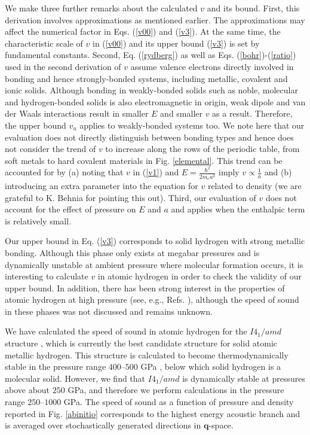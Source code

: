 \documentclass[aps,prl,groupedaddress,fleqn,twocolumn,10pt]{revtex4-1}
\begin{document}
We make three further remarks about the calculated $v$ and its bound. First, this derivation involves approximations as mentioned earlier. The approximations may affect the numerical factor in Eqs. (\ref{v00}) and (\ref{v3}). At the same time, the characteristic scale of $v$ in (\ref{v00}) and its upper bound (\ref{v3}) is set by fundamental constants. Second, Eq. (\ref{rydberg}) as well as Eqs. (\ref{bohr})-(\ref{ratio}) used in the second derivation of $v$ assume valence electrons directly involved in bonding and hence strongly-bonded systems, including metallic, covalent and ionic solids. Although bonding in weakly-bonded solids such as noble, molecular and hydrogen-bonded solids is also electromagnetic in origin, weak dipole and van der Waals interactions result in smaller $E$ \cite{vadim1} and smaller $v$ as a result. Therefore, the upper bound $v_u$ applies to weakly-bonded systems too. We note here that our evaluation does not directly distinguish between bonding types and hence does not consider the trend of $v$ to increase along the rows of the periodic table, from soft metals to hard covalent materials in Fig. \ref{elemental}. This trend can be accounted for by (a) noting that $v$ in (\ref{v1}) and $E=\frac{\hbar^2}{2m_ea^2}$ imply $v\propto\frac{1}{a}$ and (b) introducing an extra parameter into the equation for $v$ related to density (we are grateful to K. Behnia for pointing this out). Third, our evaluation of $v$ does not account for the effect of pressure on $E$ and $a$ and applies when the enthalpic term is relatively small.


Our upper bound in Eq. (\ref{v3}) corresponds to solid hydrogen with strong metallic bonding. Although this phase only exists at megabar pressures \cite{silvera,loubeyre} and is dynamically unstable at ambient pressure where molecular formation occurs, it is interesting to calculate $v$ in atomic hydrogen in order to check the validity of our upper bound. In addition, there has been strong interest in the properties of atomic hydrogen at high pressure (see, e.g., Refs. \cite{silvera,loubeyre,hydrogen}), although the speed of sound in these phases was not discussed and remains unknown.

We have calculated the speed of sound in atomic hydrogen for the $I4_1/amd$ structure \cite{i41amd,pickard_h_natphys}, which is currently the best candidate structure for solid atomic metallic hydrogen. This structure is calculated to become thermodynamically stable in the pressure range $400$--$500$ GPa \cite{azadi_metal,morales_metal}, below which solid hydrogen is a molecular solid. However, we find that $I4_1/amd$ is dynamically stable at pressures above about $250$ GPa, and therefore we perform calculations in the pressure range $250$--$1000$ GPa. The speed of sound as a function of pressure and density reported in Fig. \ref{abinitio} corresponds to the highest energy acoustic branch and is averaged over stochastically generated directions in $\mathbf{q}$-space.
\end{document}
